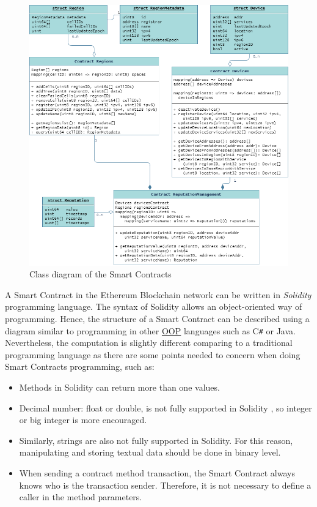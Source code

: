 \begin{figure}[htb!]
  \centering
  \includegraphics[width=\textwidth]{images/Contracts.png}
  \caption{Class diagram of the Smart Contracts}
  \label{fig:ContractsDiagram}
\end{figure}

A Smart Contract in the Ethereum Blockchain network can be written in \textit{Solidity} programming language.
The syntax of Solidity allows an object-oriented way of programming.
Hence, the structure of a Smart Contract can be described using a diagram similar to programming in other \hyperref[Acronym-OOP]{OOP} languages such as C\verb|#| or Java.
Nevertheless, the computation is slightly different comparing to a traditional programming language as there are some points needed to concern when doing Smart Contracts programming, such as:

\begin{itemize}
  \item Methods in Solidity can return more than one values.
  \item Decimal number: float or double, is not fully supported in Solidity \citep{SolidityTypes}, so integer or big integer is more encouraged.
  \item Similarly, strings are also not fully supported in Solidity.
  For this reason, manipulating and storing textual data should be done in binary level.
  \item When sending a contract method transaction, the Smart Contract always knows who is the transaction sender.
  Therefore, it is not necessary to define a caller in the method parameters.
\end{itemize}

